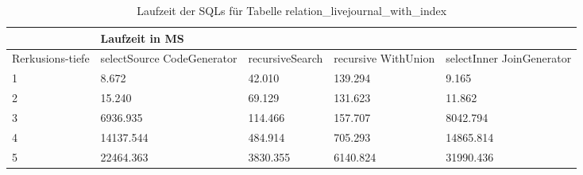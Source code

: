 \begin{table}[H]
	\centering
	\begin{tabular}{l|l|l|l|l|l|}
		\cline{2-6}
		& \multicolumn{5}{|l|}{Laufzeit in MS}                                                                                                                                                  \\ \hline
		\multicolumn{1}{|l|}{\multirow{2}{2cm}{Rerkusions-tiefe}} & \multicolumn{2}{|l|}{\multirow{2}{3cm}{selectSource CodeGenerator}} & \multirow{2}{2.8cm}{recursiveSearch} & \multirow{2}{2.5cm}{recursive WithUnion} & \multirow{2}{2.5cm}{selectInner JoinGenerator} \\
		\multicolumn{1}{|l|}{}
		& \multicolumn{2}{|l|}{}                                           &                                  &                                     &                                           \\ \hline
		
		
		\multicolumn{1}{|l|}{1}                                 & \multicolumn{2}{l|}{8.672}                                       & 42.010                                                & 139.294                                                   & 9.165                                                           \\ \hline
		\multicolumn{1}{|l|}{2}                                 & \multicolumn{2}{l|}{15.240}                                      & 69.129                                                & 131.623                                                   & 11.862                                                          \\ \hline
		\multicolumn{1}{|l|}{3}                                 & \multicolumn{2}{l|}{6936.935}                                    & 114.466                                               & 157.707                                                   & 8042.794                                                        \\ \hline
		\multicolumn{1}{|l|}{4}                                 & \multicolumn{2}{l|}{14137.544}                                   & 484.914                                               & 705.293                                                   & 14865.814                                                       \\ \hline
		\multicolumn{1}{|l|}{5}                                 & \multicolumn{2}{l|}{22464.363}                                   & 3830.355                                              & 6140.824                                                  & 31990.436                                                       \\ \hline
	\end{tabular}
	\caption{Laufzeit der SQLs für Tabelle relation\_livejournal\_with\_index}
\end{table}



